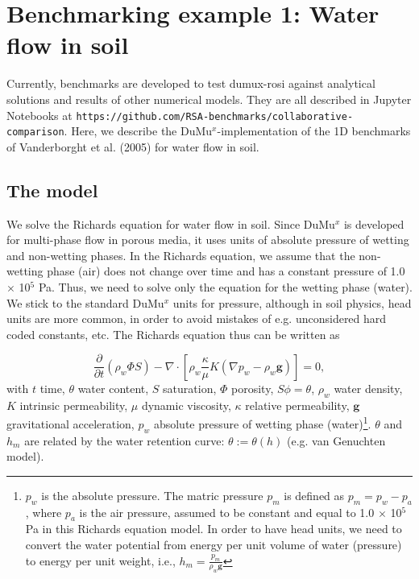 \chapter*{Benchmarking example 1: Water flow in soil}
Currently, benchmarks are developed to test dumux-rosi against analytical solutions and results of other numerical models. They are all described in Jupyter Notebooks at \lstinline{https://github.com/RSA-benchmarks/collaborative-comparison}. Here, we describe the DuMu$^x$-implementation of the 1D benchmarks of Vanderborght et al. (2005) for water flow in soil.

\section*{The model}
We solve the Richards equation for water flow in soil. Since DuMu$^x$ is developed for multi-phase flow in porous media, it uses units of absolute pressure of wetting and non-wetting phases. In the Richards equation, we assume that the non-wetting phase (air) does not change over time and has a constant pressure of 1.0 $\times$ 10$^5$ Pa. Thus, we need to solve only the equation for the wetting phase (water). We stick to the standard DuMu$^x$ units for pressure, although in soil physics, head units are more common, in order to avoid mistakes of e.g. unconsidered hard coded constants, etc. The Richards equation thus can be written as 

\begin{equation}
\frac{\partial}{\partial t} \left(\rho_w \Phi S \right) - \nabla  \cdot \left[\rho_w \frac{\kappa}{\mu}K \left(\nabla p_w-\rho_w \mathbf{g} \right) \right] = 0,
\end{equation}
with $t$ time, $\theta$ water content, $S$ saturation, $\Phi$ porosity, $S \phi = \theta$, $\rho_w$ water density, $K$ intrinsic permeability, $\mu$ dynamic viscosity, $\kappa$ relative permeability, $\mathbf{g}$ gravitational acceleration, $p_w$ absolute pressure of wetting phase (water)\footnote{$p_w$ is the absolute pressure. The matric pressure $p_m$ is defined as $p_m = p_w-p_a$, where $p_a$ is the air pressure, assumed to be constant and equal to 1.0 $\times$ 10$^5$ Pa in this Richards equation model. In order to have head units, we need to convert the water potential from energy per unit volume of water (pressure) to energy per unit weight, i.e., $h_m=\frac{p_m}{\rho_w \mathbf{g}}$}. $\theta$ and $h_m$ are related by the water retention curve: $\theta:= \theta(h)$ (e.g. van Genuchten model).

